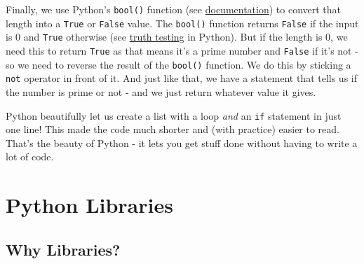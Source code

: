 \documentclass[12pt]{article}
\newcommand{\code}{\texttt}
\begin{document}
Finally, we use Python's \code{bool()} function (see \href{https://docs.python.org/3/library/functions.html#bool}{documentation}) to convert that length into a \code{True} or \code{False} value. The \code{bool()} function returns \code{False} if the input is 0 and \code{True} otherwise (see \href{https://docs.python.org/3/library/stdtypes.html#truth}{truth testing} in Python). But if the length is 0, we need this to return \code{True} as that means it's a prime number and \code{False} if it's not - so we need to reverse the result of the \code{bool()} function. We do this by sticking a \code{not} operator in front of it. And just like that, we have a statement that tells us if the number is prime or not - and we just return whatever value it gives. 

Python beautifully let us create a list with a loop \textit{and} an \code{if} statement in just one line! This made the code much shorter and (with practice) easier to read. That's the beauty of Python - it lets you get stuff done without having to write a lot of code.

\newpage
\section{Python Libraries}
\subsection{Why Libraries?}
\end{document}
